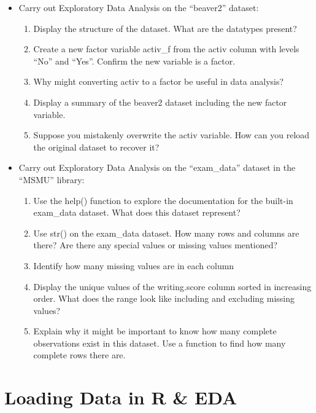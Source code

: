 \documentclass[
  letterpaper,
  DIV=11,
  numbers=noendperiod]{scrreprt}
\providecommand{\tightlist}{%
  \setlength{\itemsep}{0pt}\setlength{\parskip}{0pt}}
\begin{document}
\begin{itemize}
\tightlist
\item
  Carry out Exploratory Data Analysis on the ``beaver2'' dataset:

  \begin{enumerate}
  \def\labelenumi{\alph{enumi})}
  \tightlist
  \item
    Display the structure of the dataset. What are the datatypes
    present?
  \item
    Create a new factor variable activ\_f from the activ column with
    levels ``No'' and ``Yes''. Confirm the new variable is a factor.
  \item
    Why might converting activ to a factor be useful in data analysis?
  \item
    Display a summary of the beaver2 dataset including the new factor
    variable.
  \item
    Suppose you mistakenly overwrite the activ variable. How can you
    reload the original dataset to recover it?
  \end{enumerate}
\item
  Carry out Exploratory Data Analysis on the ``exam\_data'' dataset in
  the ``MSMU'' library:

  \begin{enumerate}
  \def\labelenumi{\alph{enumi})}
  \tightlist
  \item
    Use the help() function to explore the documentation for the
    built-in exam\_data dataset. What does this dataset represent?
  \item
    Use str() on the exam\_data dataset. How many rows and columns are
    there? Are there any special values or missing values mentioned?
  \item
    Identify how many missing values are in each column
  \item
    Display the unique values of the writing.score column sorted in
    increasing order. What does the range look like including and
    excluding missing values?
  \item
    Explain why it might be important to know how many complete
    observations exist in this dataset. Use a function to find how many
    complete rows there are.
  \end{enumerate}
\end{itemize}


\chapter{Loading Data in R \& EDA}\label{loading-data-in-r-eda}
\end{document}
